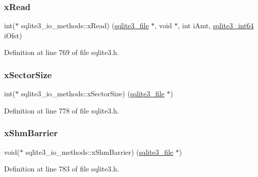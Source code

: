 \subsubsection{\texorpdfstring{x\+Read}{xRead}}
{\footnotesize\ttfamily int($\ast$ sqlite3\+\_\+io\+\_\+methods\+::x\+Read) (\mbox{\hyperlink{structsqlite3__file}{sqlite3\+\_\+file}} $\ast$, void $\ast$, int i\+Amt, \mbox{\hyperlink{sqlite3_8h_a0a4d3e6c1ad46f90e746b920ab6ca0d2}{sqlite3\+\_\+int64}} i\+Ofst)}



Definition at line 769 of file sqlite3.\+h.

\mbox{\label{structsqlite3__io__methods_a7a1c0cf3c4de6402a69f50e625be5ca2}} 
\subsubsection{\texorpdfstring{x\+Sector\+Size}{xSectorSize}}
{\footnotesize\ttfamily int($\ast$ sqlite3\+\_\+io\+\_\+methods\+::x\+Sector\+Size) (\mbox{\hyperlink{structsqlite3__file}{sqlite3\+\_\+file}} $\ast$)}



Definition at line 778 of file sqlite3.\+h.

\mbox{\label{structsqlite3__io__methods_aa4e436fef318c4702940da870f8e2710}} 
\subsubsection{\texorpdfstring{x\+Shm\+Barrier}{xShmBarrier}}
{\footnotesize\ttfamily void($\ast$ sqlite3\+\_\+io\+\_\+methods\+::x\+Shm\+Barrier) (\mbox{\hyperlink{structsqlite3__file}{sqlite3\+\_\+file}} $\ast$)}



Definition at line 783 of file sqlite3.\+h.

\mbox{\label{structsqlite3__io__methods_a2dbd4777e8ebce36b91dd5d64aef9bbf}} 
